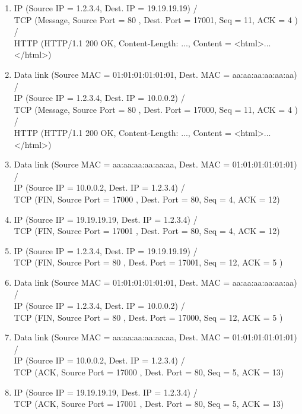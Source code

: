 \documentclass[12pt, german]{article}
\begin{document}
\begin{enumerate}[label=\alph*)]
\begin{enumerate}[label=\arabic*.]
     		\item IP (Source IP = 1.2.3.4, Dest. IP = 19.19.19.19) /\\ TCP (Message, Source Port = 80 , Dest. Port = 17001, Seq = 11, ACK = 4 ) /\\ HTTP (HTTP/1.1 200 OK, Content-Length: ..., Content = <html>...</html>)
     		\item Data link (Source MAC = 01:01:01:01:01:01, Dest. MAC =  aa:aa:aa:aa:aa:aa) /\\  IP (Source IP = 1.2.3.4, Dest. IP = 10.0.0.2) /\\ TCP (Message, Source Port = 80 , Dest. Port = 17000, Seq = 11, ACK = 4 ) /\\ HTTP (HTTP/1.1 200 OK, Content-Length: ..., Content = <html>...</html>)
     		
     		\item Data link (Source MAC = aa:aa:aa:aa:aa:aa, Dest. MAC = 01:01:01:01:01:01) /\\  IP (Source IP = 10.0.0.2, Dest. IP = 1.2.3.4) /\\ TCP (FIN, Source Port = 17000 , Dest. Port = 80, Seq = 4, ACK = 12)
     		\item IP (Source IP = 19.19.19.19, Dest. IP = 1.2.3.4) /\\ TCP (FIN, Source Port = 17001 , Dest. Port = 80, Seq = 4, ACK = 12)
     		
     		\item IP (Source IP = 1.2.3.4, Dest. IP = 19.19.19.19) /\\ TCP (FIN, Source Port = 80 , Dest. Port = 17001, Seq = 12, ACK = 5 )
     		\item Data link (Source MAC = 01:01:01:01:01:01, Dest. MAC =  aa:aa:aa:aa:aa:aa) /\\  IP (Source IP = 1.2.3.4, Dest. IP = 10.0.0.2) /\\ TCP (FIN, Source Port = 80 , Dest. Port = 17000, Seq = 12, ACK = 5 )
     		
     		\item Data link (Source MAC = aa:aa:aa:aa:aa:aa, Dest. MAC = 01:01:01:01:01:01) /\\  IP (Source IP = 10.0.0.2, Dest. IP = 1.2.3.4) /\\ TCP (ACK, Source Port = 17000 , Dest. Port = 80, Seq = 5, ACK = 13)
     		\item IP (Source IP = 19.19.19.19, Dest. IP = 1.2.3.4) /\\ TCP (ACK, Source Port = 17001 , Dest. Port = 80, Seq = 5, ACK = 13)
     		
     	\end{enumerate}
  \end{enumerate}
\newpage
     
\end{document}
